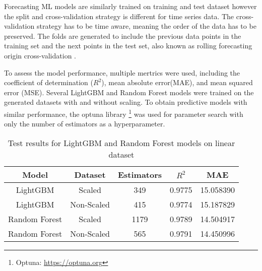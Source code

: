 
Forecasting ML models are similarly trained on training and test dataset however the split and cross-validation strategy is different for time series data.
The cross-validation strategy has to be time aware, meaning the order of the data has to be preserved.
The folds are generated to include the previous data points in the training set and the next points in the test set, also known as rolling forecasting origin cross-validation \cite{hyndman2018forecasting}.

To assess the model performance, multiple mertrics were used, including the coefficient of determination ($R^2$), mean absolute error(MAE), and mean squared error (MSE).
Several LightGBM and Random Forest models were trained on the generated datasets with and without scaling.
To obtain predictive models with similar performance, the optuna library
\footnote{Optuna: \url{https://optuna.org}} was used for parameter search with only the number of estimators as a hyperparameter.


\begin{table}
    \centering
    \caption{Test results for LightGBM and Random Forest models on linear dataset}
    \label{tab:training_results_linear}

    \begin{tabular}{|c|c|c|c|c|}
        \hline
        Model         & Dataset    & Estimators & $R^2$  & MAE       \\
        \hline
        LightGBM      & Scaled     & 349        & 0.9775 & 15.058390 \\
        LightGBM      & Non-Scaled & 415        & 0.9774 & 15.187829 \\
        Random Forest & Scaled     & 1179       & 0.9789 & 14.504917 \\
        Random Forest & Non-Scaled & 565        & 0.9791 & 14.450996 \\
        \hline
    \end{tabular}
\end{table}

